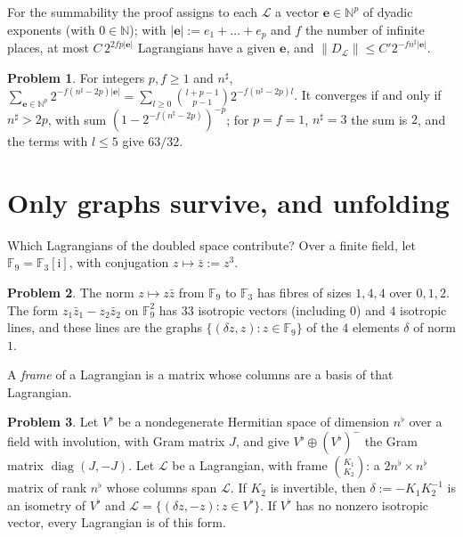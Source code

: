 \documentclass[reqno]{amsart}
\theoremstyle{definition}
\newtheorem{problem}{Problem}[section]
\theoremstyle{plain}
\newcommand{\F}{\mathbb{F}}
\newcommand{\ii}{\mathrm{i}}
\begin{document}
For the summability the proof assigns to each \(\mathcal L\) a vector \(\mathbf e \in \mathbb N^p\) of dyadic exponents (with \(0 \in \mathbb N\)); with \(\lvert\mathbf e\rvert := e_1 + \dots + e_p\) and \(f\) the number of infinite places, at most \(C\, 2^{2fp\lvert\mathbf e\rvert}\) Lagrangians have a given \(\mathbf e\), and \(\lVert D_{\mathcal L}\rVert \le C' 2^{-f n^\sharp \lvert\mathbf e\rvert}\).

\begin{problem}\label{pr:majorant}
For integers \(p, f \ge 1\) and \(n^\sharp\), \(\sum_{\mathbf e \in \mathbb N^p} 2^{-f(n^\sharp - 2p)\lvert\mathbf e\rvert} = \sum_{l \ge 0} \binom{l + p - 1}{p - 1} 2^{-f(n^\sharp - 2p) l}\).  It converges if and only if \(n^\sharp > 2p\), with sum \((1 - 2^{-f(n^\sharp - 2p)})^{-p}\); for \(p = f = 1\), \(n^\sharp = 3\) the sum is \(2\), and the terms with \(l \le 5\) give \(63/32\).
\end{problem}

\section{Only graphs survive, and unfolding}\label{sec:unfold}

Which Lagrangians of the doubled space contribute?  Over a finite field, let \(\F_9 = \F_3[\ii]\), with conjugation \(z \mapsto \bar z := z^3\).

\begin{problem}\label{pr:F9}
The norm \(z \mapsto z\bar z\) from \(\F_9\) to \(\F_3\) has fibres of sizes \(1, 4, 4\) over \(0, 1, 2\).  The form \(z_1\bar z_1 - z_2\bar z_2\) on \(\F_9^2\) has \(33\) isotropic vectors (including \(0\)) and \(4\) isotropic lines, and these lines are the graphs \(\{(\delta z, z) : z \in \F_9\}\) of the \(4\) elements \(\delta\) of norm \(1\).
\end{problem}

A \emph{frame} of a Lagrangian is a matrix whose columns are a basis of that Lagrangian.

\begin{problem}\label{pr:graph}
Let \(V^\flat\) be a nondegenerate Hermitian space of dimension \(n^\flat\) over a field with involution, with Gram matrix \(J\), and give \(V^\flat \oplus (V^\flat)^-\) the Gram matrix \(\operatorname{diag}(J, -J)\).  Let \(\mathcal L\) be a Lagrangian, with frame \(\binom{K_1}{K_2}\): a \(2n^\flat \times n^\flat\) matrix of rank \(n^\flat\) whose columns span \(\mathcal L\).  If \(K_2\) is invertible, then \(\delta := -K_1K_2^{-1}\) is an isometry of \(V^\flat\) and \(\mathcal L = \{(\delta z, -z) : z \in V^\flat\}\).  If \(V^\flat\) has no nonzero isotropic vector, every Lagrangian is of this form.
\end{problem}
\end{document}
